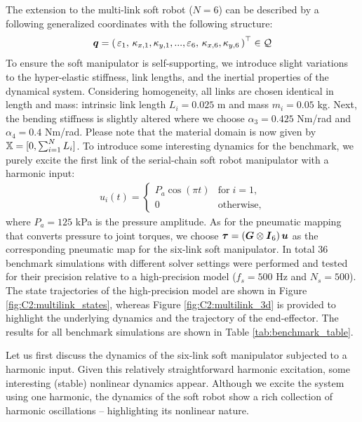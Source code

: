 %
The extension to the multi-link soft robot ($N = 6$) can be described by a following generalized coordinates with the following structure:
%
\begin{equation}
{\boldsymbol{q}} = \left(\,\varepsilon_1,\,\kappa_{x,1},\kappa_{y,1},...,\varepsilon_6,\,\kappa_{x,6},\kappa_{y,6} \, \right)^\top \in \mathcal{Q}
\end{equation}
%
To ensure the soft manipulator is self-supporting, we introduce slight variations to the hyper-elastic stiffness, link lengths, and the inertial properties of the dynamical system. Considering homogeneity, all links are chosen identical in length and mass: intrinsic link length $L_i = 0.025$ m and mass $m_i = 0.05$ kg. Next, the bending stiffness is slightly altered where we choose $\alpha_3 = 0.425$ Nm/rad and $\alpha_4 = 0.4$ Nm/rad. Please note that the material domain is now given by $\mathbb{X} = [0,\sum^N_{i=1} L_i]$. To introduce some interesting dynamics for the benchmark, we purely excite the first link of the serial-chain soft robot manipulator with a harmonic input:
%
\begin{align}
u_i(t) = \begin{cases}
P_a \cos(\pi t) & \text{for} \; i = 1, \\
0 & \text{otherwise},
\label{eq:harm_freq}
\end{cases}
\end{align}
%
where $P_a = 125$ kPa is the pressure amplitude. As for the pneumatic mapping that converts pressure to joint torques, we choose $\boldsymbol{\tau} = \left({\boldsymbol{G}} \otimes \boldsymbol{I}_6 \right){\boldsymbol{u}} $ as the corresponding pneumatic map for the six-link soft manipulator. In total 36 benchmark simulations with different solver settings were performed and tested for their precision relative to a high-precision model ($f_s = 500$ Hz and $N_s = 500$). The state trajectories of the high-precision model are shown in Figure \ref{fig:C2:multilink_states}, whereas Figure \ref{fig:C2:multilink_3d} is provided to highlight the underlying dynamics and the trajectory of the end-effector. The results for all benchmark simulations are shown in Table \ref{tab:benchmark_table}. %

Let us first discuss the dynamics of the six-link soft manipulator subjected to a harmonic input. Given this relatively straightforward harmonic excitation, some interesting (stable) nonlinear dynamics appear. Although we excite the system using one harmonic, the dynamics of the soft robot show a rich collection of harmonic oscillations -- highlighting its nonlinear nature. 

